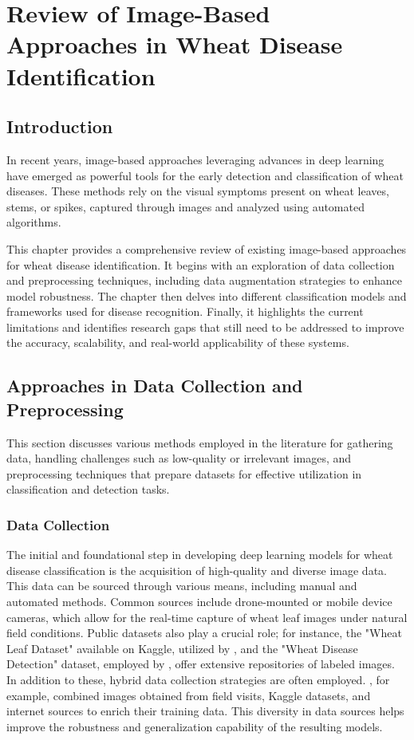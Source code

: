\chapter{Review of Image-Based Approaches in Wheat Disease Identification}

\section{Introduction}
In recent years, image-based approaches leveraging advances in deep learning have emerged as powerful tools for the early detection and classification of wheat diseases. These methods rely on the visual symptoms present on wheat leaves, stems, or spikes, captured through images and analyzed using automated algorithms.

This chapter provides a comprehensive review of existing image-based approaches for wheat disease identification. It begins with an exploration of data collection and preprocessing techniques, including data augmentation strategies to enhance model robustness. The chapter then delves into different classification models and frameworks used for disease recognition. Finally, it highlights the current limitations and identifies research gaps that still need to be addressed to improve the accuracy, scalability, and real-world applicability of these systems.

\section{Approaches in Data Collection and Preprocessing }
This section discusses various methods employed in the literature for gathering data, handling challenges such as low-quality or irrelevant images, and preprocessing techniques that prepare datasets for effective utilization in classification and detection tasks.

\subsection{Data Collection}
The initial and foundational step in developing deep learning models for wheat disease classification is the acquisition of high-quality and diverse image data. This data can be sourced through various means, including manual and automated methods. Common sources include drone-mounted or mobile device cameras, which allow for the real-time capture of wheat leaf images under natural field conditions. Public datasets also play a crucial role; for instance, the "Wheat Leaf Dataset" available on Kaggle, utilized by \parencite{ramadan2024improving}, and the "Wheat Disease Detection" dataset, employed by \parencite{reis2024integrated}, offer extensive repositories of labeled images. In addition to these, hybrid data collection strategies are often employed. \parencite{hassan2024wheat}, for example, combined images obtained from field visits, Kaggle datasets, and internet sources to enrich their training data. This diversity in data sources helps improve the robustness and generalization capability of the resulting models.


